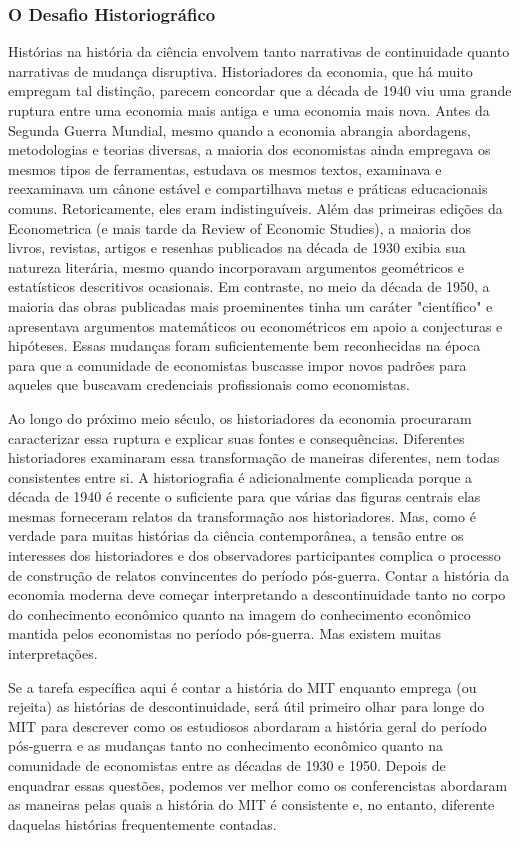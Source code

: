 \documentclass[a4paper,12pt]{article}[abntex2]
\begin{document}
\subsubsection{\textbf{O Desafio Historiográfico}}
Histórias na história da ciência envolvem tanto narrativas de continuidade quanto narrativas de mudança disruptiva. Historiadores da economia, que há muito empregam tal distinção, parecem concordar que a década de 1940 viu uma grande ruptura entre uma economia mais antiga e uma economia mais nova. Antes da Segunda Guerra Mundial, mesmo quando a economia abrangia abordagens, metodologias e teorias diversas, a maioria dos economistas ainda empregava os mesmos tipos de ferramentas, estudava os mesmos textos, examinava e reexaminava um cânone estável e compartilhava metas e práticas educacionais comuns. Retoricamente, eles eram indistinguíveis. Além das primeiras edições da Econometrica (e mais tarde da Review of Economic Studies), a maioria dos livros, revistas, artigos e resenhas publicados na década de 1930 exibia sua natureza literária, mesmo quando incorporavam argumentos geométricos e estatísticos descritivos ocasionais. Em contraste, no meio da década de 1950, a maioria das obras publicadas mais proeminentes tinha um caráter "científico" e apresentava argumentos matemáticos ou econométricos em apoio a conjecturas e hipóteses. Essas mudanças foram suficientemente bem reconhecidas na época para que a comunidade de economistas buscasse impor novos padrões para aqueles que buscavam credenciais profissionais como economistas.

Ao longo do próximo meio século, os historiadores da economia procuraram caracterizar essa ruptura e explicar suas fontes e consequências. Diferentes historiadores examinaram essa transformação de maneiras diferentes, nem todas consistentes entre si. A historiografia é adicionalmente complicada porque a década de 1940 é recente o suficiente para que várias das figuras centrais elas mesmas forneceram relatos da transformação aos historiadores. Mas, como é verdade para muitas histórias da ciência contemporânea, a tensão entre os interesses dos historiadores e dos observadores participantes complica o processo de construção de relatos convincentes do período pós-guerra. Contar a história da economia moderna deve começar interpretando a descontinuidade tanto no corpo do conhecimento econômico quanto na imagem do conhecimento econômico mantida pelos economistas no período pós-guerra. Mas existem muitas interpretações.

Se a tarefa específica aqui é contar a história do MIT enquanto emprega (ou rejeita) as histórias de descontinuidade, será útil primeiro olhar para longe do MIT para descrever como os estudiosos abordaram a história geral do período pós-guerra e as mudanças tanto no conhecimento econômico quanto na comunidade de economistas entre as décadas de 1930 e 1950. Depois de enquadrar essas questões, podemos ver melhor como os conferencistas abordaram as maneiras pelas quais a história do MIT é consistente e, no entanto, diferente daquelas histórias frequentemente contadas.
\end{document}
